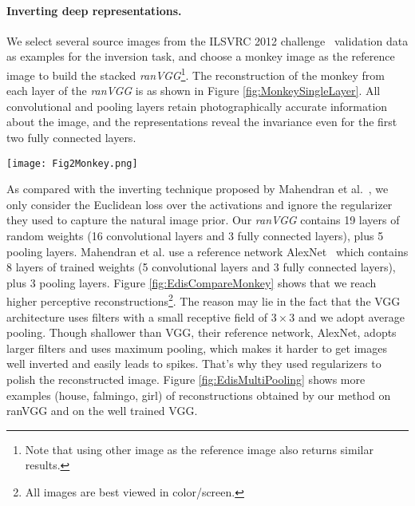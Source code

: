 \documentclass{article}
\begin{document}
\label{sec:experiments}


\paragraph{Inverting deep representations.}

We select several source images from the ILSVRC 2012 challenge~\cite{ILSVRC} validation data as examples for the inversion task,
and choose a monkey image as the reference image to build the stacked \emph{ranVGG}\footnote{Note that using other image as the reference image also returns similar results.}.
The reconstruction of the monkey from each layer of the \emph{ranVGG} is as shown in Figure \ref{fig:MonkeySingleLayer}.
All convolutional and pooling layers retain photographically accurate information about the image,
and the representations reveal the invariance even for the first two fully connected layers.%

\begin{figure*}[htbp]
\centering
	\vspace{-1em}
	\texttt{[image: Fig2Monkey.png]}%
	\vspace{-1em}
	\caption{\textbf{Reconstructions of the monkey from each layer of the random weight CNN, ranVGG.} The monkey image is well reconstructed from activations of any of the 16 convolutional layers after the rectifier and the 5 average pooling layers, and we could still see the rough contours from the first two fully connected layers.}%
	\label{fig:MonkeySingleLayer} %
\end{figure*}

As compared with the inverting technique proposed by Mahendran et al.~\cite{Mahendran2015CVPR},
we only consider the Euclidean loss over the activations and ignore the regularizer they used to capture the natural image prior.
Our \emph{ranVGG} contains 19 layers of random weights (16 convolutional layers and 3 fully connected layers), plus 5 pooling layers.
Mahendran et al. use a reference network AlexNet~\cite{Alex2012NIPS} which contains 8 layers of trained weights (5 convolutional layers and 3 fully connected layers), plus 3 pooling layers. Figure \ref{fig:EdisCompareMonkey} shows that we reach higher perceptive reconstructions\footnote{All images are best viewed in color/screen.}.
The reason may lie in the fact that the VGG architecture uses filters with a small receptive field of $3 \times 3$ and we adopt average pooling.
Though shallower than VGG, their reference network, AlexNet, adopts larger filters
 and uses maximum pooling, which makes it harder to get images well inverted and easily leads to spikes. That's why they used regularizers to polish the reconstructed image.
Figure \ref{fig:EdisMultiPooling} shows more examples (house, falmingo, girl) of reconstructions obtained by our method on ranVGG and on the well trained VGG.
\end{document}
